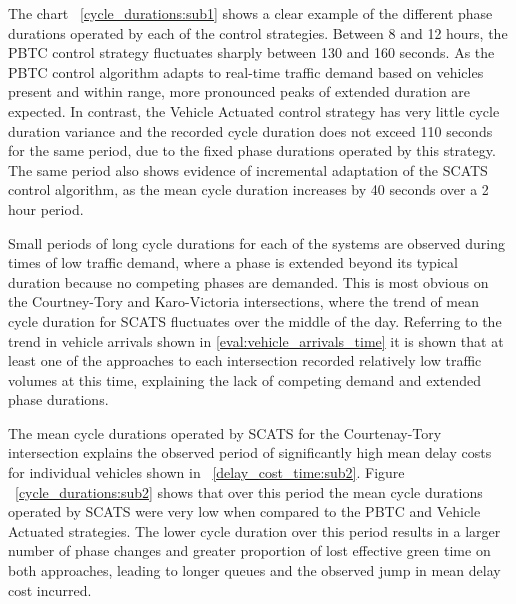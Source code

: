 The chart ~\ref{cycle_durations:sub1} shows a clear example of the different phase durations operated by each of the control strategies. Between 8 and 12 hours, the PBTC control strategy fluctuates sharply between 130 and 160 seconds. As the PBTC control algorithm adapts to real-time traffic demand based on vehicles present and within range, more pronounced peaks of extended duration are expected. In contrast, the Vehicle Actuated control strategy has very little cycle duration variance and the recorded cycle duration does not exceed 110 seconds for the same period, due to the fixed phase durations operated by this strategy. The same period also shows evidence of incremental adaptation of the SCATS control algorithm, as the mean cycle duration increases by 40 seconds over a 2 hour period. 

Small periods of long cycle durations for each of the systems are observed during times of low traffic demand, where a phase is extended beyond its typical duration because no competing phases are demanded. This is most obvious on the Courtney-Tory and Karo-Victoria intersections, where the trend of mean cycle duration for SCATS fluctuates over the middle of the day. Referring to the trend in vehicle arrivals shown in \ref{eval:vehicle_arrivals_time} it is shown that at least one of the approaches to each intersection recorded relatively low traffic volumes at this time, explaining the lack of competing demand and extended phase durations.

The mean cycle durations operated by SCATS for the Courtenay-Tory intersection explains the observed period of significantly high mean delay costs for individual vehicles shown in ~\ref{delay_cost_time:sub2}. Figure ~\ref{cycle_durations:sub2} shows that over this period the mean cycle durations operated by SCATS were very low when compared to the PBTC and Vehicle Actuated strategies. The lower cycle duration over this period results in a larger number of phase changes and greater proportion of lost effective green time on both approaches, leading to longer queues and the observed jump in mean delay cost incurred. 

